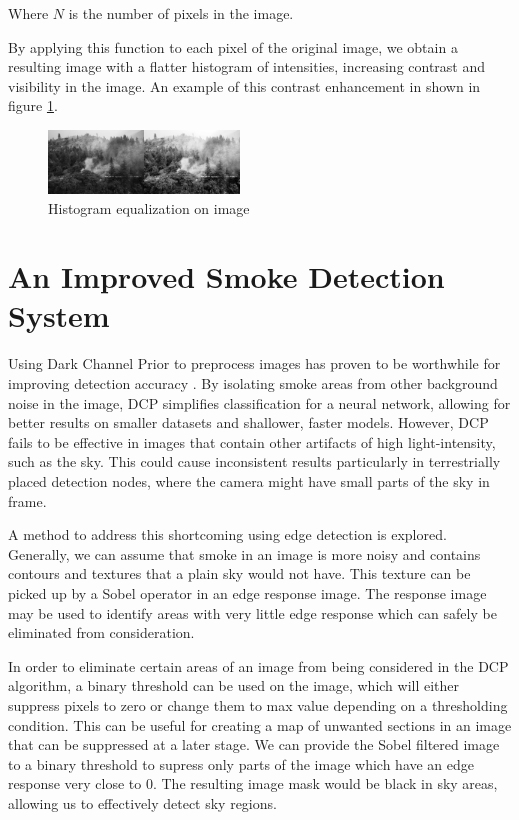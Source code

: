 \documentclass[lettersize,journal]{IEEEtran}
\begin{document}
Where \(N\) is the number of pixels in the image.

By applying this function to each pixel of the original image, we obtain
a resulting image with a flatter histogram of intensities, increasing
contrast and visibility in the image. An example of this contrast enhancement in shown in figure \ref{heq}.

\begin{figure}
        \centering
        \includegraphics[width=2in]{firehe.png}
        \caption{Histogram equalization on image}
        \label{heq}
\end{figure}

\section{An Improved Smoke Detection System}

Using Dark Channel Prior to preprocess images has proven to be
worthwhile for improving detection accuracy
\cite{dcpsmoke}\cite{dcpsmoke2}. By isolating smoke areas from other
background noise in the image, DCP simplifies classification for a
neural network, allowing for better results on smaller datasets and
shallower, faster models. However, DCP fails to be effective in images
that contain other artifacts of high light-intensity, such as the sky.
This could cause inconsistent results particularly in terrestrially
placed detection nodes, where the camera might have small parts of the
sky in frame.

A method to address this shortcoming using edge detection is explored.
Generally, we can assume that smoke in an image is more noisy and
contains contours and textures that a plain sky would not have. This
texture can be picked up by a Sobel operator in an edge response image.
The response image may be used to identify areas with very little edge
response which can safely be eliminated from consideration.

In order to eliminate certain areas of an image from being considered in
the DCP algorithm, a binary threshold can be used on the image, which
will either suppress pixels to zero or change them to max value
depending on a thresholding condition. This can be useful for creating a
map of unwanted sections in an image that can be suppressed at a later
stage. We can provide the Sobel filtered image to a binary threshold to
supress only parts of the image which have an edge response very close
to 0. The resulting image mask would be black in sky areas, allowing us
to effectively detect sky regions.
\end{document}
